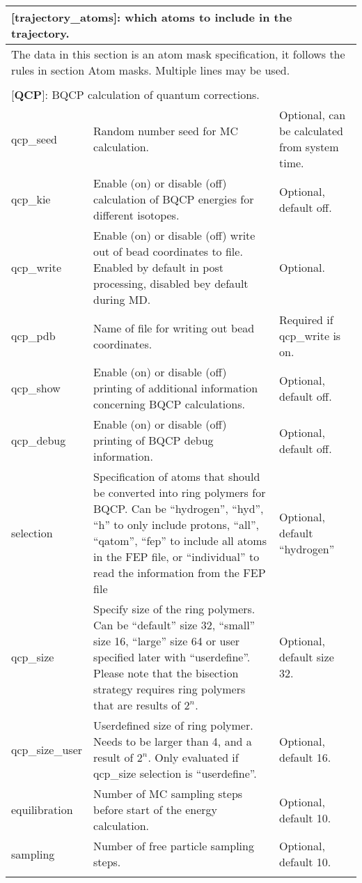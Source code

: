 \documentclass[a4paper,11pt]{article}
\begin{document}
\begin{longtable}{|p{78pt}|p{158pt}|p{158pt}|}
\multicolumn{3}{p{394pt}}{[\textbf{trajectory\_atoms}]: which atoms to include in the trajectory.}\\
\hline
\multicolumn{3}{|p{394pt}|}{The data in this section is an atom mask specification, it follows the rules in section Atom masks. Multiple lines may be used.}\\
\hline
\multicolumn{3}{p{394pt}}{}\\
\multicolumn{3}{p{394pt}}{[\textbf{QCP}]: BQCP calculation of quantum corrections.}\\
\hline qcp{\_}seed & Random number seed for MC calculation. & Optional, can be calculated from system time.\\
\hline qcp{\_}kie  & Enable (on) or disable (off) calculation of BQCP energies for different isotopes. & Optional, default off. \\
\hline qcp{\_}write & Enable (on) or disable (off) write out of bead coordinates to file. Enabled by default in post processing, disabled bey default during MD. & Optional. \\
\hline qcp{\_}pdb & Name of file for writing out bead coordinates. & Required if qcp{\_}write is on. \\
\hline qcp{\_show} & Enable (on) or disable (off) printing of additional information concerning  BQCP calculations. & Optional, default off. \\
\hline qcp{\_}debug & Enable (on) or disable (off) printing of BQCP debug information. & Optional, default off.\\
\hline selection & Specification of atoms that should be converted into ring polymers for BQCP. Can be ``hydrogen'', ``hyd'', ``h'' to only include protons, ``all'', ``qatom'', ``fep'' to include all atoms in the FEP file, or ``individual'' to read the information from the FEP file & Optional, default ``hydrogen''\\
\hline qcp{\_}size & Specify size of the ring polymers. Can be ``default'' size 32, ``small'' size 16, ``large'' size 64 or user specified later with ``userdefine''. Please note that the bisection strategy requires ring polymers that are results of $2^{n}$. & Optional, default size 32.\\
\hline qcp{\_}size{\_}user & Userdefined size of ring polymer. Needs to be larger than 4, and a result of $2^{n}$. Only evaluated if qcp{\_}size selection is ``userdefine''. & Optional, default 16.\\
\hline equilibration & Number of MC sampling steps before start of the energy calculation. & Optional, default 10.\\
\hline sampling & Number of free particle sampling steps. & Optional, default 10.\\
\hline
\multicolumn{3}{p{394pt}}{}\\


\end{longtable}
\end{document}

